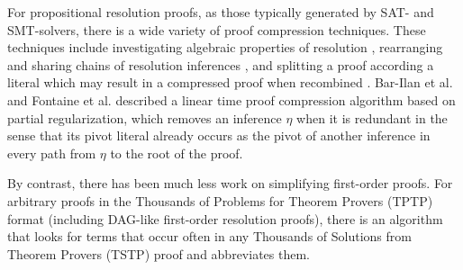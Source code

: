 
For propositional resolution proofs, as those typically generated by SAT- and SMT-solvers, there is a wide variety of proof compression techniques. 
These techniques include investigating algebraic properties of resolution \cite{bwp10}, rearranging and sharing chains of resolution inferences \cite{Amjad07, Sinz}, and splitting a proof according a literal which may result in a compressed proof when recombined \cite{CottonSplit}.
Bar-Ilan et al. \cite{RP08} and Fontaine et al. \cite{LURPI} described a linear time proof compression algorithm based on partial
regularization, which removes an inference $\eta$ when it is redundant in the sense that its pivot literal already occurs as the pivot of another inference in every path from $\eta$ to the root of the proof.


By contrast, there has been much less work on simplifying first-order proofs. 
For arbitrary proofs in the Thousands of Problems for Theorem Provers (TPTP) \cite{TPTP} format (including DAG-like first-order resolution proofs), there is an algorithm \cite{LPARCzech} that looks for terms that occur often in any Thousands of Solutions from Theorem Provers (TSTP) \cite{TPTP} proof and abbreviates them. 


